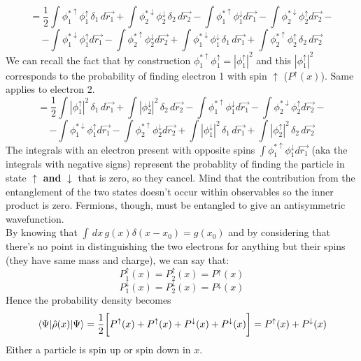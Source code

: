 \[
=\frac{1}{2}\int \phi_1^{*\uparrow}\phi_1^\uparrow \,\delta_1\, d\vec{r_1}
+\int \phi_2^{*\downarrow}\phi_2^\downarrow\, \delta_2\, d\vec{r_2}
-\int \phi_1^{*\uparrow}\phi_1^\downarrow d\vec{r_1}
-\int \phi_2^{*\downarrow}\phi_2^\uparrow d\vec{r_2}-\]
\[
-\int \phi_1^{*\downarrow}\phi_1^\uparrow d\vec{r_1}
-\int \phi_2^{*\uparrow}\phi_2^\downarrow d\vec{r_2}
+\int \phi_1^{*\downarrow}\phi_1^\downarrow\, \delta_1\, d\vec{r_1}
+\int \phi_2^{*\uparrow}\phi_2^\uparrow\, \delta_2\, d\vec{r_2}
\]
We can recall the fact that by construction $\phi_1^{*\uparrow}\phi_1^\uparrow=|\phi_1^\uparrow|^2$  and this $|\phi_1^\uparrow|^2$ corresponds to the probability of finding electron 1 with spin $\uparrow$ ($P^\uparrow(x)$). Same applies to electron 2.\\
\[
=\frac{1}{2}\int |\phi_1^\uparrow|^2 \,\delta_1\, d\vec{r_1}
+\int |\phi_2^\downarrow|^2\, \delta_2\, d\vec{r_2}
-\int \phi_1^{*\uparrow}\phi_1^\downarrow d\vec{r_1}
-\int \phi_2^{*\downarrow}\phi_2^\uparrow d\vec{r_2}-\]
\[
-\int \phi_1^{*\downarrow}\phi_1^\uparrow d\vec{r_1}
-\int \phi_2^{*\uparrow}\phi_2^\downarrow d\vec{r_2}
+\int |\phi_1^\downarrow|^2\, \delta_1\, d\vec{r_1}
+\int |\phi_2^\uparrow|^2\, \delta_2\, d\vec{r_2}
\]
The integrals with an electron present with opposite spins $\int \phi_1^{*\uparrow}\phi_1^\downarrow d\vec{r_1}$ (aka the integrals with negative signs) represent the probablity of finding the particle in state $\uparrow$ \textbf{and} $\downarrow$ that is zero, so they cancel. Mind that the contribution from the entanglement of the two states doesn't occur within observables so the inner product is zero. Fermions, though, must be entangled to give an antisymmetric wavefunction.\\
By knowing that $\int\,dx\, g(x)\delta(x-x_0)=g(x_0)$ and by considering that there's no point in distinguishing the two electrons for anything but their spins (they have same mass and charge), we can say that:
\[P_1^\uparrow(x)=P_2^\uparrow(x)=P^\uparrow(x)\]
\[P_1^\downarrow(x)=P_2^\downarrow(x)=P^\downarrow(x)\]
Hence the probability density becomes
\[
\mel{\Psi}{\hat{\rho}(x)}{\Psi}=\frac{1}{2}\bigg[P^\uparrow(x)+P^\uparrow(x)+P^\downarrow(x)+P^\downarrow(x)\bigg]=P^\uparrow(x)+P^\downarrow(x)
\]
Either a particle is spin up or spin down in $x$.
